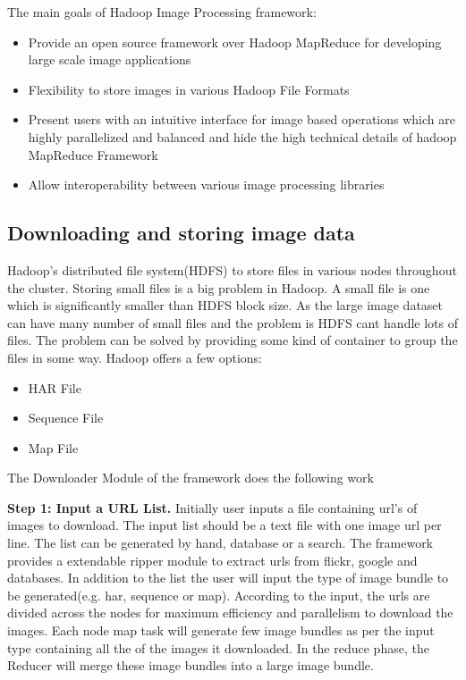 \documentclass[conference]{IEEEtran}
\begin{document}
The main goals of Hadoop Image Processing framework:
\begin{itemize}
	\item Provide an open source framework over Hadoop MapReduce for developing large scale image applications 
	\item Flexibility to store images in various Hadoop File Formats
	\item Present users with an intuitive interface for image based operations which are highly parallelized and balanced and hide the high technical details of hadoop MapReduce Framework
	\item Allow interoperability between various image processing libraries
\end{itemize}

\subsection{Downloading and storing image data}
Hadoop's distributed file system(HDFS) to store files in various nodes throughout the cluster. Storing small files\cite{White2009} is a big problem in Hadoop. A small file is one which is significantly smaller than HDFS block size. As the large image dataset can have many number of small files and the problem is HDFS cant handle lots of files. The problem can be solved by providing some kind of container to group the files in some way. Hadoop offers a few options:
\begin{itemize}
	\item HAR File
	\item Sequence File
	\item Map File
\end{itemize}

The Downloader Module of the framework does the following work

\textbf{Step 1: Input a URL List.} Initially user inputs a file containing url's of images to download. The input list should be a text file with one image url per line. The list can be generated by hand, database or a search. The framework provides a extendable ripper module to extract urls from flickr, google and databases. In addition to the list the user will input the type of image bundle to be generated(e.g. har, sequence or map). According to the input, the urls are divided across the nodes for maximum efficiency and parallelism to download the images. Each node map task will generate few image bundles as per the input type containing all the of the images it downloaded. In the reduce phase, the Reducer will merge these image bundles  into a large image bundle.
\end{document}
